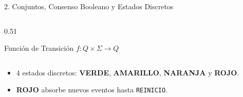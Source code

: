 \documentclass[aspectratio=169]{beamer}
\begin{document}
\begin{frame}{2. Conjuntos, Consenso Booleano y Estados Discretos}
\begin{columns}[T]
\begin{column}{0.51\textwidth}
\begin{block}{Función de Transición $f: Q \times \Sigma \to Q$}
\begin{tabular}{@{}lllll@{}}
                \end{tabular}
            \end{block}
            \begin{itemize}
                \footnotesize
                \item $4$ estados discretos: \textcolor{univerde}{\textbf{VERDE}}, \textcolor{yellow!60!orange}{\textbf{AMARILLO}}, \textcolor{orange!90!black}{\textbf{NARANJA}} y \textcolor{unialerta}{\textbf{ROJO}}.
                \item \textbf{ROJO} absorbe nuevos eventos hasta \texttt{REINICIO}.
            \end{itemize}
        \end{column}
    \end{columns}
\end{frame}
\end{document}
